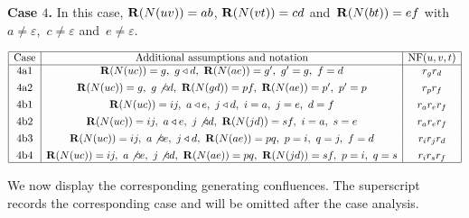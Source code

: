 \documentclass[a4paper, twoside, 11pt, english]{article}
\begin{document}
\medskip

\noindent
\textbf{Case $4$.}
In this case, $\mathbf{R}(N(uv))=ab$, $\mathbf{R}(N(vt))=cd$ and~$\mathbf{R}(N(bt))=ef$ with~$a\neq\varepsilon$,~$c\neq\varepsilon$ and~$e\neq\varepsilon$.

\[
\begin{array}{|c|c|c|}
\hline
\text{Case} & \text{Additional assumptions and notation} & \operatorname{NF}(u,v,t) \\ \hline
4\mathrm a1
&
\R(N(uc))=g,\ g\triangleleft d,\ \R(N(ae))=g',\ g'=g,\ f=d
&
r_g r_d
\\[0.4em]
4\mathrm a2
&
\R(N(uc))=g,\ g\not\triangleleft d,\ \R(N(gd))=pf,\ \R(N(ae))=p',\ p'=p
&
r_p r_f
\\[0.4em]
4\mathrm b1
&
\R(N(uc))=ij,\ a\triangleleft e,\ j\triangleleft d,\ i=a,\ j=e,\ d=f
&
r_a r_e r_f
\\[0.4em]
4\mathrm b2
&
\R(N(uc))=ij,\ a\triangleleft e,\ j\not\triangleleft d,\ \R(N(jd))=sf,\ i=a,\ s=e
&
r_a r_e r_f
\\[0.4em]
4\mathrm b3
&
\R(N(uc))=ij,\ a\not\triangleleft e,\ j\triangleleft d,\ \R(N(ae))=pq,\ p=i,\ q=j,\ f=d
&
r_i r_j r_d
\\[0.4em]
4\mathrm b4
&
\R(N(uc))=ij,\ a\not\triangleleft e,\ j\not\triangleleft d,\ \R(N(ae))=pq,\ \R(N(jd))=sf,\ p=i,\ q=s
&
r_i r_s r_f\\ \hline
\end{array}
\]

\medskip


We now display the corresponding generating confluences. The superscript records the corresponding case and will be omitted
after the case analysis.

\medskip
\end{document}
